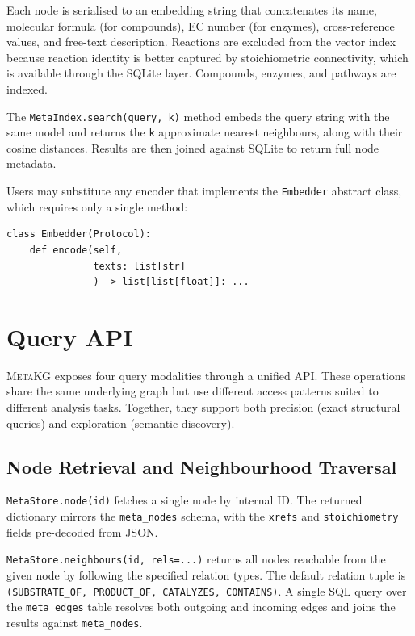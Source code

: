 \documentclass[10pt]{article}
\begin{document}
Each node is serialised to an embedding string that concatenates its name,
molecular formula (for compounds), EC number (for enzymes), cross-reference
values, and free-text description. Reactions are excluded from the vector
index because reaction identity is better captured by stoichiometric
connectivity, which is available through the SQLite layer. Compounds, enzymes,
and pathways are indexed.

The \texttt{MetaIndex.search(query, k)} method embeds the query string with
the same model and returns the \texttt{k} approximate nearest neighbours,
along with their cosine distances. Results are then joined against SQLite to
return full node metadata.

Users may substitute any encoder that implements the \texttt{Embedder}
abstract class, which requires only a single method:

\begin{lstlisting}[style=python]
class Embedder(Protocol):
    def encode(self,
               texts: list[str]
               ) -> list[list[float]]: ...
\end{lstlisting}

\section{Query API}
\label{sec:query}

\textsc{MetaKG} exposes four query modalities through a unified API. These
operations share the same underlying graph but use different access patterns
suited to different analysis tasks. Together, they support both precision
(exact structural queries) and exploration (semantic discovery).

\subsection{Node Retrieval and Neighbourhood Traversal}

\texttt{MetaStore.node(id)} fetches a single node by internal ID. The
returned dictionary mirrors the \texttt{meta\_nodes} schema, with the
\texttt{xrefs} and \texttt{stoichiometry} fields pre-decoded from JSON.

\texttt{MetaStore.neighbours(id, rels=...)} returns all nodes reachable
from the given node by following the specified relation types. The default
relation tuple is \texttt{(SUBSTRATE\_OF, PRODUCT\_OF, CATALYZES, CONTAINS)}.
A single SQL query over the \texttt{meta\_edges} table resolves both
outgoing and incoming edges and joins the results against \texttt{meta\_nodes}.
\end{document}
